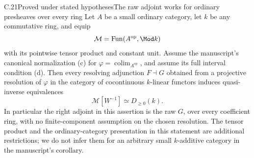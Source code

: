 \begin{claim}{C.21}{Proved under stated hypotheses}{The raw adjoint works for ordinary presheaves over every ring}\label{C21}
Let $A$ be a small ordinary category, let $k$ be any commutative ring, and equip
\[
 \mathcal M=\operatorname{Fun}(A^{\mathrm{op}},\Mod k)
\]
with its pointwise tensor product and constant unit. Assume the manuscript's canonical normalization (c) for $\varphi=\operatorname{colim}_{A^{\mathrm{op}}}$, and assume its full interval condition (d). Then every resolving adjunction $F\dashv G$ obtained from a projective resolution of $\varphi$ in the category of cocontinuous $k$-linear functors induces quasi-inverse equivalences
\[
 \mathcal M[W^{-1}]\simeq D_{\geq0}(k).
\]
In particular the right adjoint in this assertion is the raw $G$, over every coefficient ring, with no finite-component assumption on the chosen resolution. The tensor product and the ordinary-category presentation in this statement are additional restrictions; we do not infer them for an arbitrary small $k$-additive category in the manuscript's corollary.
\end{claim}
